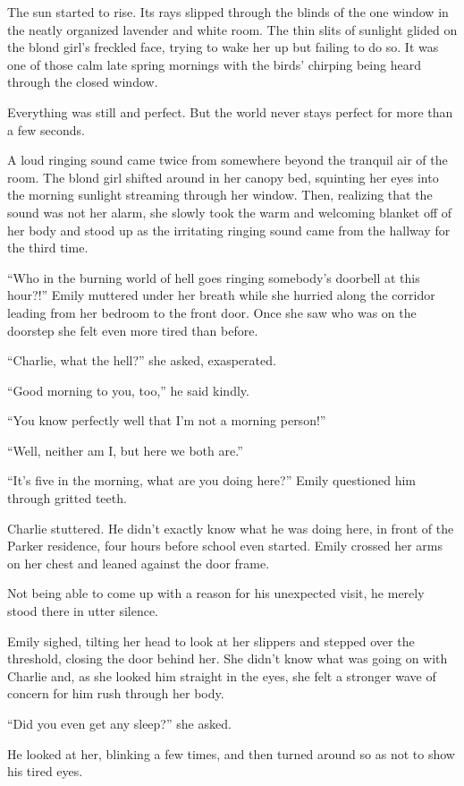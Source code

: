 The sun started to rise. Its rays slipped through the blinds of the one window in the neatly organized lavender and white room. The thin slits of sunlight glided on the blond girl’s freckled face, trying to wake her up but failing to do so. It was one of those calm late spring mornings with the birds’ chirping being heard through the closed window.

Everything was still and perfect. But the world never stays perfect for more than a few seconds.

A loud ringing sound came twice from somewhere beyond the tranquil air of the room. The blond girl shifted around in her canopy bed, squinting her eyes into the morning sunlight streaming through her window. Then, realizing that the sound was not her alarm, she slowly took the warm and welcoming blanket off of her body and stood up as the irritating ringing sound came from the hallway for the third time.

“Who in the burning world of hell goes ringing somebody’s doorbell at this hour?!” Emily muttered under her breath while she hurried along the corridor leading from her bedroom to the front door. Once she saw who was on the doorstep she felt even more tired than before.

“Charlie, what the hell?” she asked, exasperated.

“Good morning to you, too,” he said kindly.

“You know perfectly well that I’m not a morning person!”

“Well, neither am I, but here we both are.”

“It’s five in the morning, what are you doing here?” Emily questioned him through gritted teeth.

Charlie stuttered. He didn’t exactly know what he was doing here, in front of the Parker residence, four hours before school even started. Emily crossed her arms on her chest and leaned against the door frame.

Not being able to come up with a reason for his unexpected visit, he merely stood there in utter silence.

Emily sighed, tilting her head to look at her slippers and stepped over the threshold, closing the door behind her. She didn’t know what was going on with Charlie and, as she looked him straight in the eyes, she felt a stronger wave of concern for him rush through her body.

“Did you even get any sleep?” she asked.

He looked at her, blinking a few times, and then turned around so as not to show his tired eyes.

